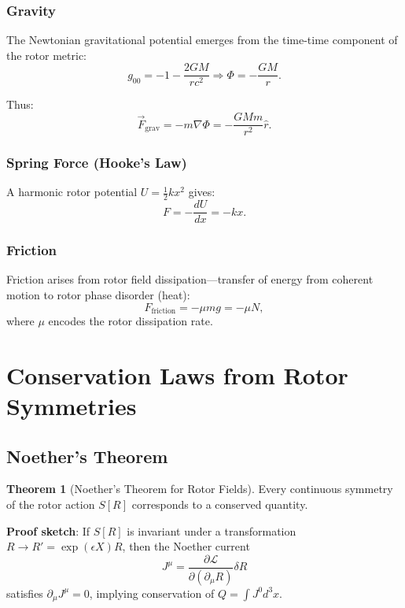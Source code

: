 \documentclass[12pt,a4paper]{article}
\theoremstyle{definition}
\newtheorem{theorem}{Theorem}[section]
\theoremstyle{remark}
\begin{document}
\subsubsection{Gravity}

The Newtonian gravitational potential emerges from the time-time component of the rotor metric:
\begin{equation}
g_{00} = -1 - \frac{2GM}{rc^2} \Rightarrow \Phi = -\frac{GM}{r}.
\end{equation}

Thus:
\begin{equation}
\vec{F}_{\text{grav}} = -m\nabla \Phi = -\frac{GMm}{r^2} \hat{r}.
\end{equation}

\subsubsection{Spring Force (Hooke's Law)}

A harmonic rotor potential $U = \frac{1}{2}k x^2$ gives:
\begin{equation}
F = -\frac{dU}{dx} = -kx.
\end{equation}

\subsubsection{Friction}

Friction arises from rotor field dissipation—transfer of energy from coherent motion to rotor phase disorder (heat):
\begin{equation}
F_{\text{friction}} = -\mu m g = -\mu N,
\end{equation}
where $\mu$ encodes the rotor dissipation rate.

\section{Conservation Laws from Rotor Symmetries}

\subsection{Noether's Theorem}

\begin{theorem}[Noether's Theorem for Rotor Fields]
Every continuous symmetry of the rotor action $S[R]$ corresponds to a conserved quantity.
\end{theorem}

\textbf{Proof sketch}: If $S[R]$ is invariant under a transformation $R \to R' = \exp(\epsilon X) R$, then the Noether current
\begin{equation}
J^\mu = \frac{\partial \mathcal{L}}{\partial(\partial_\mu R)} \delta R
\end{equation}
satisfies $\partial_\mu J^\mu = 0$, implying conservation of $Q = \int J^0 d^3x$.
\end{document}
